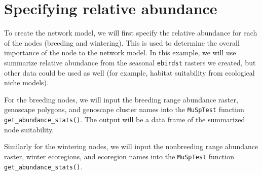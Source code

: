 \documentclass[
]{book}
\newenvironment{Shaded}{\begin{snugshade}}{\end{snugshade}}
\newcommand{\AttributeTok}[1]{\textcolor[rgb]{0.77,0.63,0.00}{#1}}
\newcommand{\DocumentationTok}[1]{\textcolor[rgb]{0.56,0.35,0.01}{\textbf{\textit{#1}}}}
\newcommand{\FunctionTok}[1]{\textcolor[rgb]{0.00,0.00,0.00}{#1}}
\newcommand{\NormalTok}[1]{#1}
\newcommand{\OtherTok}[1]{\textcolor[rgb]{0.56,0.35,0.01}{#1}}
\newcommand{\SpecialCharTok}[1]{\textcolor[rgb]{0.00,0.00,0.00}{#1}}
\newcommand{\StringTok}[1]{\textcolor[rgb]{0.31,0.60,0.02}{#1}}
\begin{document}
\hypertarget{specifying-relative-abundance}{%
\section{Specifying relative abundance}\label{specifying-relative-abundance}}

To create the network model, we will first specify the relative abundance for each of the nodes (breeding and wintering). This is used to determine the overall importance of the node to the network model. In this example, we will use summarize relative abundance from the seasonal \texttt{ebirdst} rasters we created, but other data could be used as well (for example, habitat suitability from ecological niche models).

For the breeding nodes, we will input the breeding range abundance raster, genoscape polygons, and genoscape cluster names into the \texttt{MuSpTest} function \texttt{get\_abundance\_stats()}. The output will be a data frame of the summarized node suitability.

\begin{Shaded}
\end{Shaded}

Similarly for the wintering nodes, we will input the nonbreeding range abundance raster, winter ecoregions, and ecoregion names into the \texttt{MuSpTest} function \texttt{get\_abundance\_stats()}.
\end{document}
